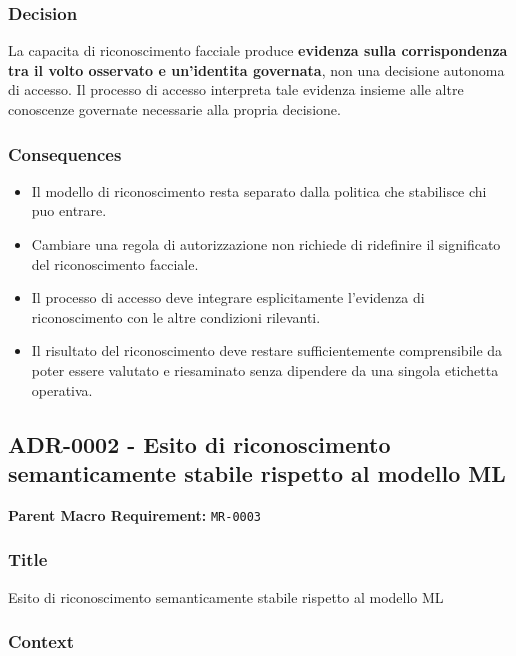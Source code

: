 \documentclass[
  10pt,
]{article}
\providecommand{\tightlist}{%
  \setlength{\itemsep}{0pt}\setlength{\parskip}{0pt}}
\begin{document}
\subsubsection{Decision}\label{decision-4}

La capacita di riconoscimento facciale produce \textbf{evidenza sulla
corrispondenza tra il volto osservato e un'identita governata}, non una
decisione autonoma di accesso. Il processo di accesso interpreta tale
evidenza insieme alle altre conoscenze governate necessarie alla propria
decisione.

\subsubsection{Consequences}\label{consequences-4}

\begin{itemize}
\tightlist
\item
  Il modello di riconoscimento resta separato dalla politica che
  stabilisce chi puo entrare.
\item
  Cambiare una regola di autorizzazione non richiede di ridefinire il
  significato del riconoscimento facciale.
\item
  Il processo di accesso deve integrare esplicitamente l'evidenza di
  riconoscimento con le altre condizioni rilevanti.
\item
  Il risultato del riconoscimento deve restare sufficientemente
  comprensibile da poter essere valutato e riesaminato senza dipendere
  da una singola etichetta operativa.
\end{itemize}

\subsection{ADR-0002 - Esito di riconoscimento semanticamente stabile
rispetto al modello
ML}\label{adr-0002---esito-di-riconoscimento-semanticamente-stabile-rispetto-al-modello-ml}

\textbf{Parent Macro Requirement:} \texttt{MR-0003}

\subsubsection{Title}\label{title-5}

Esito di riconoscimento semanticamente stabile rispetto al modello ML

\subsubsection{Context}\label{context-5}
\end{document}
